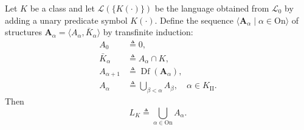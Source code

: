 Let $K$ be a class and let $\mathcal{L}(\{K(\cdot)\})$ be the language obtained from $\mathcal{L}_0$ by adding a unary predicate symbol $K(\cdot)$. Define the sequence $\langle \mathbf{A}_\alpha \mid \alpha \in \mathrm{On} \rangle$ of structures $\mathbf{A}_\alpha = \langle A_\alpha, \bar{K}_\alpha \rangle$ by transfinite induction:
\begin{align*}
A_0 &\triangleq 0, \\
\bar{K}_\alpha &\triangleq A_\alpha \cap K, \\
A_{\alpha+1} &\triangleq \operatorname{Df}(\mathbf{A}_\alpha), \\
A_\alpha &\triangleq \bigcup_{\beta < \alpha} A_\beta, \quad \alpha \in K_{\mathrm{II}}.
\end{align*}
Then
$$L_K \triangleq \bigcup_{\alpha \in \mathrm{On}} A_\alpha.$$
